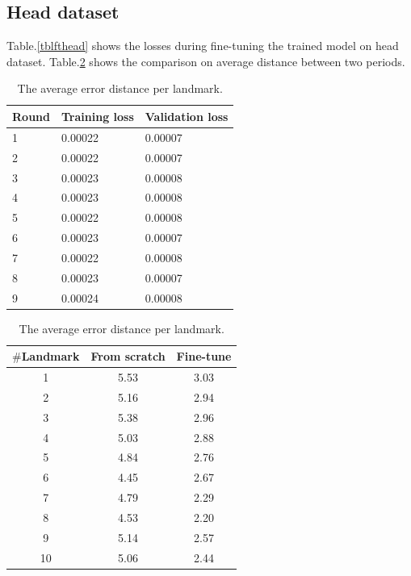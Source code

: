 \documentclass[12pt,a4paper]{article}
\begin{document}
\subsection{Head dataset}
Table.\ref{tblfthead} shows the losses during fine-tuning the trained model on head dataset. Table.\ref{tblcmphead} shows the comparison on average distance between two periods.

\begin{table}[ht]
\begin{minipage}[b]{0.5\textwidth}
	\centering
	\begin{tabular}{l l l}
	Round & Training loss & Validation loss \\ \hline
	1 & 0.00022 & 0.00007  \\ \hline
	2 & 0.00022 & 0.00007 \\ \hline
	3 & 0.00023 & 0.00008 \\ \hline
	4 & 0.00023 & 0.00008 \\ \hline
	5 & 0.00022 & 0.00008 \\ \hline
	6 & 0.00023 & 0.00007 \\ \hline
	7 & 0.00022 & 0.00008 \\ \hline
	8 & 0.00023 & 0.00007 \\ \hline
	9 & 0.00024 & 0.00008 \\ \hline
	\end{tabular}
	\caption{The losses during fine-tuning model on head dataset}
	\label{tblfthead}
\end{minipage}
\hfill
\begin{minipage}[b]{0.5\textwidth}
\centering
\begin{tabular}{|c|c|c|}
\hline
\textbf{$\#$Landmark} & \textbf{From scratch} & \textbf{Fine-tune} \\ \hline
1 & 5.53 & 3.03  \\ \hline
2 & 5.16 & 2.94  \\ \hline
3 & 5.38  & 2.96 \\ \hline
4 & 5.03  & 2.88 \\ \hline
5 & 4.84  & 2.76 \\ \hline
6 & 4.45  & 2.67 \\ \hline
7 & 4.79  & 2.29 \\ \hline
8 & 4.53  & 2.20 \\ \hline
9 & 5.14  & 2.57 \\ \hline
10 & 5.06  & 2.44 \\ \hline
\end{tabular}
\caption{The average error distance per landmark.}
\label{tblcmphead}
\end{minipage}
\end{table}
\end{document}
